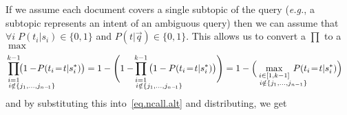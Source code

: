 

If we assume each document covers a single subtopic of the query (\emph{e.g.},
a subtopic represents an intent of an ambiguous query) then we can assume that 
$\forall i \; P(t_i|s_i) \in \{0,1\}$ and $P(t|\vec{q}) \in \{0,1\}$.  This
allows us to convert a $\prod$ to a $\max$ 
\begin{align*}
  \hspace{-13mm} \prod_{\substack{i=1 \\ \hspace{14mm} i \notin \{j_1, \dots, j_{n-\!1}\}}}^{k-1} \hspace{-14mm} \bigl( 1 - \!P(t_i\!=\!t|s_i^*) \bigr) & =
1 - \Biggl( 1 - \hspace{-14mm} \prod_{\substack{i=1 \\ \hspace{14mm} i \notin \{j_1, \dots, j_{n-\!1}\}}}^{k-1} \hspace{-13mm} \bigl( 1 - P(t_i\!=\!t|s_i^*) \bigr) \Biggr) 
   = 1 - \Bigl( \hspace{-6mm} \max_{\substack{i \in [1,k-1] \\ \hspace{7mm} i \notin \{j_1, \dots, j_{n-1}\}}} \hspace{-6mm} P(t_i\!=\!t|s_i^*) \Bigr)
\end{align*}
and by substituting this into~\eqref{eq.ncall.alt} and distributing, we get
